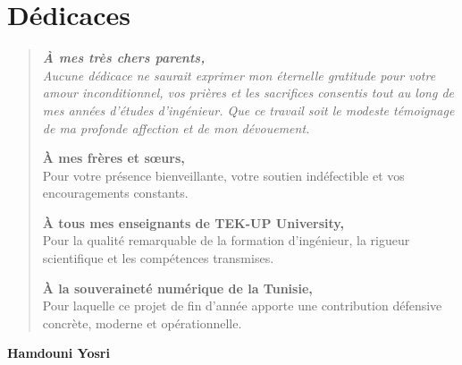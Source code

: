 \newpage
\thispagestyle{plain}
\chapter*{Dédicaces}

\vspace{1.2cm}

\begin{quote}
\itshape
\noindent
{\large \textbf{À mes très chers parents,}}\\[2mm]
Aucune dédicace ne saurait exprimer mon éternelle gratitude pour votre amour inconditionnel, vos prières et les sacrifices consentis tout au long de mes années d'études d'ingénieur. Que ce travail soit le modeste témoignage de ma profonde affection et de mon dévouement.

\vspace{0.8cm}
\noindent
{\large \textbf{À mes frères et sœurs,}}\\[2mm]
Pour votre présence bienveillante, votre soutien indéfectible et vos encouragements constants.

\vspace{0.8cm}
\noindent
{\large \textbf{À tous mes enseignants de TEK-UP University,}}\\[2mm]
Pour la qualité remarquable de la formation d'ingénieur, la rigueur scientifique et les compétences transmises.

\vspace{0.8cm}
\noindent
{\large \textbf{À la souveraineté numérique de la Tunisie,}}\\[2mm]
Pour laquelle ce projet de fin d'année apporte une contribution défensive concrète, moderne et opérationnelle.
\end{quote}

\vspace{1.5cm}

\begin{flushright}
    \textbf{\Large Hamdouni Yosri}
\end{flushright}
